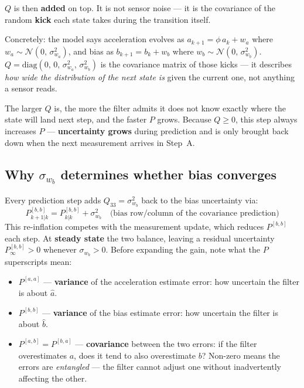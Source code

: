 \documentclass[12pt, a4paper]{article}
\begin{document}
$Q$ is then \textbf{added} on top.
It is not sensor noise --- it is the covariance of the random
\textbf{kick} each state takes during the transition itself.

Concretely: the model says acceleration evolves as
$a_{k+1} = \phi\,a_k + w_a$ where $w_a \sim \mathcal{N}(0,\,\sigma_{w_a}^2)$,
and bias as $b_{k+1} = b_k + w_b$ where $w_b \sim \mathcal{N}(0,\,\sigma_{w_b}^2)$.
$Q = \mathrm{diag}(0,\,0,\,\sigma_{w_a}^2,\,\sigma_{w_b}^2)$ is the
covariance matrix of those kicks --- it describes \emph{how wide the
distribution of the next state is} given the current one, not anything
a sensor reads.

The larger $Q$ is, the more the filter admits it does not know exactly
where the state will land next step, and the faster $P$ grows.
Because $Q \geq 0$, this step always increases $P$ ---
\textbf{uncertainty grows} during prediction and is only brought back
down when the next measurement arrives in Step~A.

\subsection*{Why $\sigma_{w_b}$ determines whether bias converges}

Every prediction step adds $Q_{33} = \sigma_{w_b}^2$ back to the bias
uncertainty via:
\[
  P_{k+1|k}^{[b,b]}
  = P_{k|k}^{[b,b]} + \sigma_{w_b}^2
  \quad \text{(bias row/column of the covariance prediction)}
\]
This re-inflation competes with the measurement update, which reduces
$P^{[b,b]}$ each step.
At \textbf{steady state} the two balance, leaving a residual uncertainty
$P_\infty^{[b,b]} > 0$ whenever $\sigma_{w_b} > 0$.
Before expanding the gain, note what the $P$ superscripts mean:
\begin{itemize}[leftmargin=1.4em, topsep=2pt]
  \item $P^{[a,a]}$ --- \textbf{variance} of the acceleration estimate
        error: how uncertain the filter is about $\hat{a}$.
  \item $P^{[b,b]}$ --- \textbf{variance} of the bias estimate error:
        how uncertain the filter is about $\hat{b}$.
  \item $P^{[a,b]} = P^{[b,a]}$ --- \textbf{covariance} between the
        two errors: if the filter overestimates $a$, does it tend to
        also overestimate $b$?
        Non-zero means the errors are \emph{entangled} --- the filter
        cannot adjust one without inadvertently affecting the other.
\end{itemize}
\end{document}
